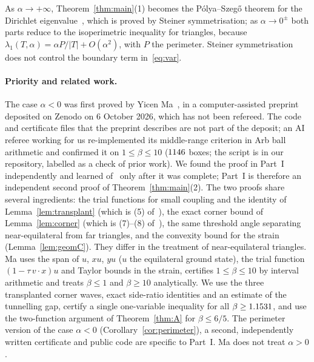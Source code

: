 \documentclass[11pt]{article}
\theoremstyle{remark}
\begin{document}
As $\alpha\to+\infty$, Theorem~\ref{thm:main}(1) becomes the P\'olya--Szeg\H{o}
theorem for the Dirichlet eigenvalue~\cite{PS}, which is proved by Steiner symmetrisation; as
$\alpha\to0^\pm$ both parts reduce to the isoperimetric inequality for triangles, because
$\lambda_1(T,\alpha)=\alpha P/|T|+O(\alpha^2)$, with $P$ the perimeter. Steiner symmetrisation does not
control the boundary term in~\eqref{eq:var}.

\paragraph{Priority and related work.} The case $\alpha<0$ was first proved by Yicen Ma~\cite{Ma}, in a
computer-assisted preprint deposited on Zenodo on 6 October 2026, which has not been refereed. The code
and certificate files that the preprint describes are not part of the deposit; an AI referee working
for us re-implemented its middle-range criterion in Arb ball arithmetic and confirmed it on
$1\le\beta\le10$ ($1146$ boxes; the script is in our repository, labelled as a check of prior
work). We found the proof in Part~I independently and learned of~\cite{Ma} only after it was complete;
Part~I is therefore an independent second proof of Theorem~\ref{thm:main}(2). The two proofs share
several ingredients: the trial functions for small coupling and the identity of
Lemma~\ref{lem:transplant} (which is (5) of~\cite{Ma}), the exact corner bound of
Lemma~\ref{lem:corner} (which is (7)--(8) of~\cite{Ma}), the same threshold angle separating
near-equilateral from far triangles, and the convexity bound for the strain
(Lemma~\ref{lem:geomC}). They differ in the treatment of near-equilateral triangles. Ma uses the span of
$u$, $xu$, $yu$ ($u$ the equilateral ground state), the trial function $(1-\tau\,v\cdot x)u$ and Taylor
bounds in the strain, certifies $1\le\beta\le10$ by interval arithmetic and treats $\beta\le1$ and
$\beta\ge10$ analytically. We use the three transplanted corner waves, exact side-ratio identities and an
estimate of the tunnelling gap, certify a single one-variable inequality for all
$\beta\ge1.1531$, and use the two-function argument of Theorem~\ref{thm:A} for $\beta\le6/5$.
The perimeter version of the case $\alpha<0$ (Corollary~\ref{cor:perimeter}), a second,
independently written certificate and public code are specific to Part~I. Ma does not treat $\alpha>0$.
\end{document}
